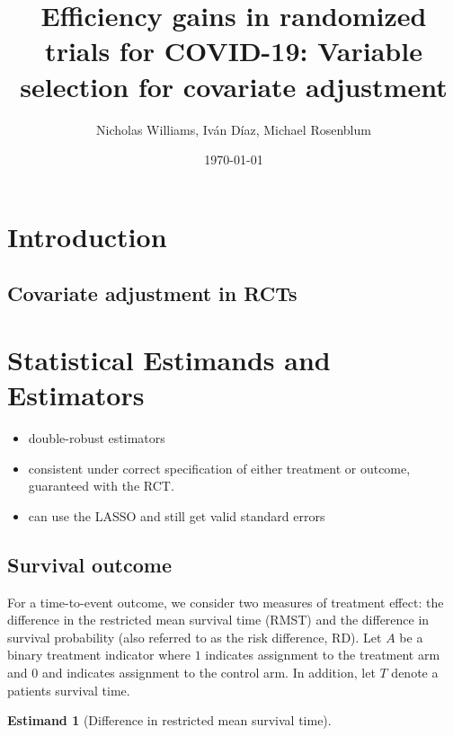 \documentclass{article}
\title{
 {Efficiency gains in randomized trials for COVID-19: Variable selection for covariate adjustment}\\
}
\author{Nicholas Williams, Iván Díaz, Michael Rosenblum}
\date{\today}
\begin{document}
\maketitle

\begin{abstract}
\end{abstract}

\section{Introduction}

\subsection{Covariate adjustment in RCTs}

\citep{covid19power}

\section{Statistical Estimands and Estimators}

\citep{vanderLaanRubin2006}
\citep{diaz2019improved}
\citep{diazOrdinal}

\begin{itemize}
  \item double-robust estimators
  \item consistent under correct specification of either treatment or outcome, guaranteed with the RCT.
  \item can use the LASSO and still get valid standard errors
\end{itemize}

\subsection{Survival outcome}

\newtheorem{surv}{Estimand}

For a time-to-event outcome, we consider two measures of treatment effect: the difference in the restricted mean survival time (RMST) and the difference in survival probability (also referred to as the risk difference, RD). Let $A$ be a binary treatment indicator where $1$ indicates assignment to the treatment arm and $0$ and indicates assignment to the control arm. In addition, let $T$ denote a patients survival time.

\begin{surv}[Difference in restricted mean survival time]
\label{rmst}
\end{surv}
\end{document}
